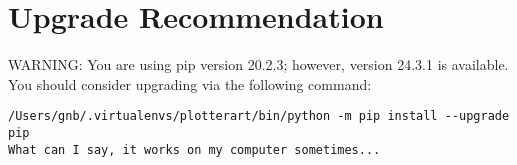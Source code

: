 \section*{Upgrade Recommendation}

WARNING: You are using pip version 20.2.3; however, version 24.3.1 is available.\\
You should consider upgrading via the following command:
\begin{Verbatim}
/Users/gnb/.virtualenvs/plotterart/bin/python -m pip install --upgrade pip
What can I say, it works on my computer sometimes...
\end{Verbatim}
